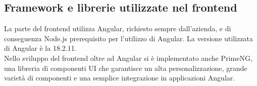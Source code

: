 \subsection{Framework e librerie utilizzate nel frontend}
    La parte del frontend utilizza Angular, richiesto sempre dall'azienda, 
    e di conseguenza Node.js prerequisito per l'utilizzo di Angular.
    La versione utilizzata di Angular è la 18.2.11.\\
    Nello sviluppo del frontend oltre ad Angular si è implementato anche PrimeNG, 
    una libreria di componenti UI che garantisce un alta personalizzazione, grande varietà di componenti 
    e una semplice integrazione in applicazioni Angular.